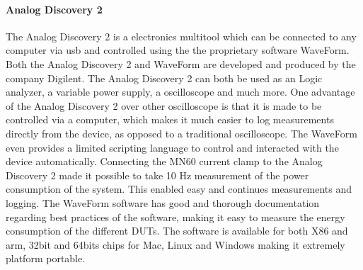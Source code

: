 \paragraph*{Analog Discovery 2}
The Analog Discovery 2 is a electronics multitool which can be connected to any computer via usb and controlled using the the proprietary software WaveForm. Both the Analog Discovery 2 and WaveForm are developed and produced by the company Digilent. The Analog Discovery 2 can both be used as an Logic analyzer, a variable power supply, a oscilloscope and much more\cite{AnalogDoc}. One advantage of the Analog Discovery 2 over other oscilloscope is that it is made to be controlled via a computer, which makes it much easier to log measurements directly from the device, as opposed to a traditional oscilloscope. The WaveForm even provides a limited scripting language to control and interacted with the device automatically. Connecting the MN60 current clamp to the Analog Discovery 2 made it possible to take 10 Hz measurement of the power consumption of the system. This enabled easy and continues measurements and logging. The WaveForm software has good and thorough documentation regarding best practices of the software, making it easy to measure the energy consumption of the different DUTs. The software is available for both X86 and arm, 32bit and 64bits chips for Mac, Linux and Windows making it extremely platform portable.